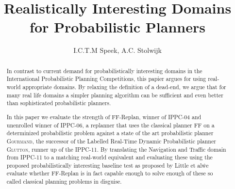 \documentclass[runningheads,a4paper]{llncs}
\begin{document}
\mainmatter%

\title{Realistically Interesting Domains for Probabilistic Planners}


\author{I.C.T.M Speek, A.C. Stolwijk}

%



\maketitle


\begin{abstract}
	In contrast to current demand for probabilistically interesting domains in the International Probabilistic Planning Competitions, this papier argues for using real-world appropriate domains. By relaxing the definition of a dead-end, we argue that for many
real life domains a simpler planning algorithm can be sufficient and even better than sophisticated probabilistic planners.

In this paper we evaluate the strength of FF-Replan, winner of IPPC-04 and unenrolled winner of IPPC-06, a replanner that uses the classical planner FF on a determinized probabilistic problem against a state of the art probabilistic planner \textsc{Gourmand}, the successor of the Labelled Real-Time Dynamic Probabilistic planner \textsc{Glutton}, runner up of the IPPC-11. By translating the Navigation and Traffic domain from IPPC-11 to a matching real-world equivalent and evaluating these using the proposed probabilistically interesting baseline test as proposed by Little et al\. we evaluate whether FF-Replan is in fact capable enough to solve enough of these so called classical planning problems in disguise.
\end{abstract}
\end{document}
